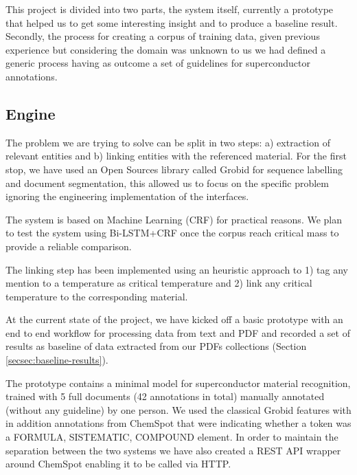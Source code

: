 \documentclass{article}
\begin{document}
This project is divided into two parts, the system itself, currently a prototype that helped us to get some interesting insight and to produce a baseline result. Secondly, the process for creating a corpus of training data, given previous experience \cite{nadev} but considering the domain was unknown to us we had defined a generic process having as outcome a set of guidelines for superconductor annotations.  


\subsection{Engine}
\label{sec:overview}
The problem we are trying to solve can be split in two steps: a) extraction of relevant entities and b) linking entities with the referenced material. 
For the first stop, we have used an Open Sources library called Grobid\cite{GROBID} for sequence labelling and document segmentation, this allowed us to focus on the specific problem ignoring the engineering implementation of the interfaces.

The system is based on Machine Learning (CRF) for practical reasons. We plan to test the system using Bi-LSTM+CRF once the corpus reach critical mass to provide a reliable comparison. 

The linking step has been implemented using an heuristic approach to 1) tag any mention to a temperature as critical temperature and 2) link any critical temperature to the corresponding material. 

At the current state of the project, we have kicked off a basic prototype with an end to end workflow for processing data from text and PDF and recorded a set of results as baseline of data extracted from our PDFs collections (Section \ref{secsec:baseline-results}). 

The prototype contains a minimal model for superconductor material recognition, trained with 5 full documents (42 annotations in total) manually annotated (without any guideline) by one person. We used the classical Grobid features with in addition annotations from  ChemSpot\cite{10.1093/bioinformatics/bts183} that were indicating whether a token was a FORMULA, SISTEMATIC, COMPOUND element. In order to maintain the separation between the two systems we have also created a REST API wrapper around ChemSpot enabling it to be called via HTTP\cite{chemspot-web}.  
\end{document}
